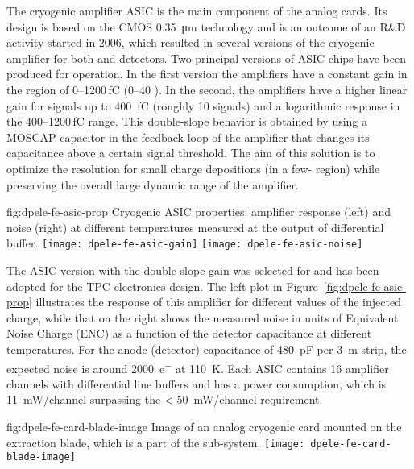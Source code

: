The cryogenic amplifier ASIC is the main component of the  analog cards. Its design is based on the CMOS \SI{0.35}{\micro\meter} technology and is an outcome of an R\&D  activity started in 2006, which resulted in several versions of the cryogenic amplifier for both \single and \dual {} detectors. Two principal versions of ASIC chips have been produced for \dual {} operation. In the first version the amplifiers have a constant gain in the region of \numrange{0}{1200}\,\si{\femto\coulomb} (\numrange{0}{40} ). In the second, the amplifiers have a higher linear gain for signals up to \SI{400}{\femto\coulomb} (roughly \num{10}  signals) and a logarithmic response in the \numrange{400}{1200}\,\si{\femto\coulomb} range. This double-slope behavior is obtained by using a MOSCAP capacitor in the feedback loop of the amplifier that changes its capacitance above a certain signal threshold. The aim of this solution is to optimize the resolution for small charge depositions (in a few- region) while preserving the overall large dynamic range of the amplifier.

\begin{dunefigure}{fig:dpele-fe-asic-prop}
{Cryogenic  ASIC properties: amplifier response (left) and noise (right) at different temperatures measured at the output of differential buffer.}
\texttt{[image: dpele-fe-asic-gain]}
\texttt{[image: dpele-fe-asic-noise]}
\end{dunefigure}

The ASIC version with the double-slope gain was selected for  and has been adopted for the \dual TPC electronics design. The left plot in Figure~\ref{fig:dpele-fe-asic-prop} illustrates the response of this amplifier for different values of the injected charge, while that on the right shows the measured noise in units of Equivalent Noise Charge (ENC) as a function of the detector capacitance at different temperatures. 
For the  anode (detector) capacitance of \SI{480}{\pico\farad} per \SI{3}{\metre} strip, the expected noise is around \SI{2000}{e^{-}} at \SI{110}{\kelvin}. Each ASIC contains \num{16} amplifier channels with differential line buffers and has a power consumption, which is \SI{11}{\milli\watt/channel} surpassing the \SI{< 50}{\milli\watt/channel} requirement. 

\begin{dunefigure}{fig:dpele-fe-card-blade-image}
{Image of an analog cryogenic  card mounted on the extraction blade, which is a part of the  sub-system.}
\texttt{[image: dpele-fe-card-blade-image]}
\end{dunefigure}

